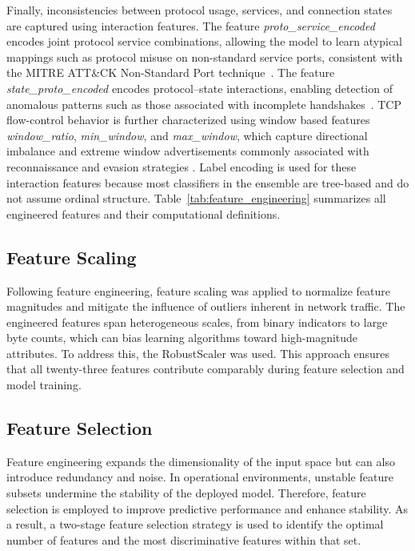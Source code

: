 \documentclass[pdflatex,sn-mathphys-num]{sn-jnl}
\theoremstyle{thmstyleone}%
\theoremstyle{thmstyletwo}%
\theoremstyle{thmstylethree}%
\begin{document}
Finally, inconsistencies between protocol usage, services, and connection states are captured using interaction features. The feature \textit{proto\_service\_encoded} encodes joint protocol service combinations, allowing the model to learn atypical mappings such as protocol misuse on 
non-standard service ports, consistent with the MITRE ATT\&CK Non-Standard Port technique~\cite{NonStandardPort}. The feature \textit{state\_proto\_encoded} encodes protocol–state interactions, enabling detection of anomalous patterns such as those associated with incomplete handshakes~\cite{GARCIATEODORO200918}. TCP flow-control behavior is further characterized using window based features \textit{window\_ratio}, \textit{min\_window}, and \textit{max\_window}, which capture directional imbalance and extreme window advertisements commonly associated with reconnaissance and evasion strategies \cite{Kreibich2005, Allman2009}. Label encoding is used for these interaction features because most classifiers in the ensemble are tree-based and do not assume ordinal structure. Table~\ref{tab:feature_engineering} summarizes all engineered features and their computational definitions.

\subsection{Feature Scaling}
Following feature engineering, feature scaling was applied to normalize feature magnitudes and mitigate the influence of outliers inherent in network traffic. The engineered features span heterogeneous scales, from binary indicators to large byte counts, which can bias learning algorithms toward high-magnitude attributes. To address this, the RobustScaler was used. This approach ensures that all twenty-three features contribute comparably during feature selection and model training.

\subsection{Feature Selection}

Feature engineering expands the dimensionality of the input space but can also introduce redundancy and noise. In operational environments, unstable feature subsets undermine the stability of the deployed model. Therefore, feature selection is employed to improve predictive performance and enhance stability. As a result, a two-stage feature selection strategy is used to identify the optimal number of features and the most discriminative features within that set.
\end{document}
